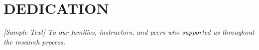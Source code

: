 %



\chapter*{\large\bf DEDICATION }




%  



\begin{center}
\emph{[Sample Text] To our families, instructors, and peers who supported us throughout the research process.}  
\end{center}


\pagebreak{}
